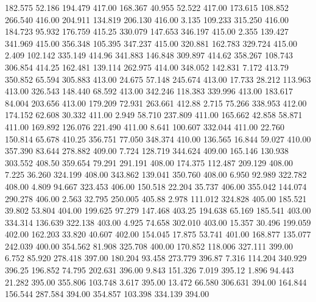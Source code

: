  182.575   52.186  194.479       417.00
 168.367   40.955   52.522       417.00
 173.615  108.852  266.540       416.00
 204.911  134.819  206.130       416.00
   3.135  109.233  315.250       416.00
 184.723   95.932  176.759       415.25
 330.079  147.653  346.197       415.00
   2.355  139.427  341.969       415.00
 356.348  105.395  347.237       415.00
 320.881  162.783  329.724       415.00
   2.409  102.142  335.149       414.96
 341.883  146.848  309.897       414.62
 358.267  108.743  306.854       414.25
 162.481  139.114  262.975       414.00
 348.052  142.831    7.172       413.79
 350.852   65.594  305.883       413.00
  24.675   57.148  245.674       413.00
  17.733   28.212  113.963       413.00
 326.543  148.440   68.592       413.00
 342.246  118.383  339.996       413.00
 183.617   84.004  203.656       413.00
 179.209   72.931  263.661       412.88
   2.715   75.266  338.953       412.00
 174.152   62.608   30.332       411.00
   2.949   58.710  237.809       411.00
 165.662   42.858   58.871       411.00
 169.892  126.076  221.490       411.00
   8.641  100.607  332.044       411.00
  22.760  150.814   65.678       410.25
 356.751   77.050  348.374       410.00
 136.565   16.844   59.027       410.00
 357.390   83.644  278.882       409.00
   7.724  128.719  344.624       409.00
 165.146  130.938  303.552       408.50
 359.654   79.291  291.191       408.00
 174.375  112.487  209.129       408.00
   7.225   36.260  324.199       408.00
 343.862  139.041  350.760       408.00
   6.950   92.989  322.782       408.00
   4.809   94.667  323.453       406.00
 150.518   22.204   35.737       406.00
 355.042  144.074  290.278       406.00
   2.563   32.795  250.005       405.88
   2.978  111.012  324.828       405.00
 185.521   39.802   53.804       404.00
 199.625   97.279  147.468       403.25
 194.638   65.169  185.541       403.00
 334.314  136.639  322.138       403.00
   4.925   74.658  302.010       403.00
  15.357   30.496  199.059       402.00
 162.203   33.820   40.607       402.00
 154.045   17.875   53.741       401.00
 168.877  135.077  242.039       400.00
 354.562   81.908  325.708       400.00
 170.852  118.006  327.111       399.00
   6.752   85.920  278.418       397.00
 180.204   93.458  273.779       396.87
   7.316  114.204  340.929       396.25
 196.852   74.795  202.631       396.00
   9.843  151.326    7.019       395.12
   1.896   94.443   21.282       395.00
 355.806  103.748    3.617       395.00
  13.472   66.580  306.631       394.00
 164.844  156.544  287.584       394.00
 354.857  103.398  334.139       394.00
